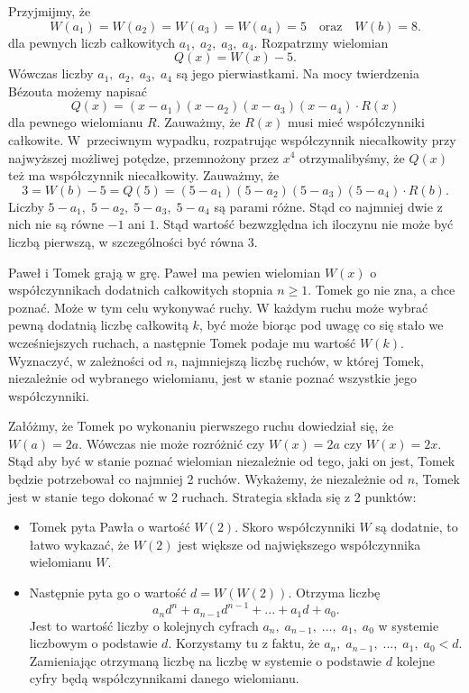 \noindent
Przyjmijmy, że
\[
    W(a_1) = W(a_2) = W(a_3) = W(a_4) = 5 \quad \text{oraz} \quad W(b) = 8.
\]
dla pewnych liczb całkowitych $a_1, \; a_2, \; a_3, \; a_4$.
Rozpatrzmy wielomian
\[
    Q(x) = W(x) - 5.
\]
Wówczas liczby $a_1, \; a_2, \; a_3, \; a_4$ są jego pierwiastkami. Na mocy twierdzenia Bézouta możemy napisać
\[
    Q(x) = (x - a_1)(x - a_2)(x - a_3)(x - a_4) \cdot R(x)
\]
dla pewnego wielomianu $R$. Zauważmy, że $R(x)$ musi mieć współczynniki całkowite. W~przeciwnym wypadku, rozpatrując współczynnik niecałkowity przy najwyższej możliwej potędze, przemnożony przez $x^4$ otrzymalibyśmy, że $Q(x)$ też ma współczynnik niecałkowity.
Zauważmy, że
\[
    3 = W(b) - 5 = Q(5) = (5 - a_1)(5 - a_2)(5 - a_3)(5 - a_4) \cdot R(b).
\]
Liczby $5 - a_1, \; 5 - a_2, \;5 - a_3, \;5 - a_4$ są parami różne. Stąd co najmniej dwie z nich nie są równe $-1$ ani $1$. Stąd wartość bezwzględna ich iloczynu nie może być liczbą pierwszą, w szczególności być równa $3$.


\begin{problem}{6}
    Paweł i Tomek grają w grę.
    Paweł ma pewien wielomian $W(x)$ o współczynnikach dodatnich całkowitych stopnia $n \geqslant 1$. Tomek go nie zna, a chce poznać. Może w tym celu wykonywać ruchy. W każdym ruchu może wybrać pewną dodatnią liczbę całkowitą $k$, być może biorąc pod uwagę co się stało we wcześniejszych ruchach, a następnie Tomek podaje mu wartość $W(k)$. Wyznaczyć, w zależności od $n$, najmniejszą liczbę ruchów, w której Tomek, niezależnie od wybranego wielomianu, jest w stanie poznać wszystkie jego współczynniki.
\end{problem}

\noindent
Załóżmy, że Tomek po wykonaniu pierwszego ruchu dowiedział się, że $W(a) = 2a$. Wówczas nie może rozróżnić czy $W(x) = 2a$ czy $W(x) = 2x$. Stąd aby być w stanie poznać wielomian niezależnie od tego, jaki on jest, Tomek będzie potrzebował co najmniej 2 ruchów.
Wykażemy, że niezależnie od $n$, Tomek jest w stanie tego dokonać w 2 ruchach.
Strategia składa się z 2 punktów:
\begin{itemize}
    \item Tomek pyta Pawła o wartość $W(2)$. Skoro współczynniki $W$ są dodatnie, to łatwo wykazać, że $W(2)$ jest większe od największego współczynnika wielomianu $W$.
    \item Następnie pyta go o wartość $d = W(W(2))$. Otrzyma liczbę
    \[
        a_n d^n + a_{n - 1}d^{n - 1} + ... + a_1d + a_0.
    \]
    Jest to wartość liczby o kolejnych cyfrach $a_n, \; a_{n - 1}, \; ..., \; a_{1}, \; a_0$ w systemie liczbowym o podstawie $d$. Korzystamy tu z faktu, że $a_n, \; a_{n - 1}, \; ..., \; a_{1}, \; a_0 < d$. Zamieniając otrzymaną liczbę na liczbę w systemie o podstawie $d$ kolejne cyfry będą współczynnikami danego wielomianu.
\end{itemize}

